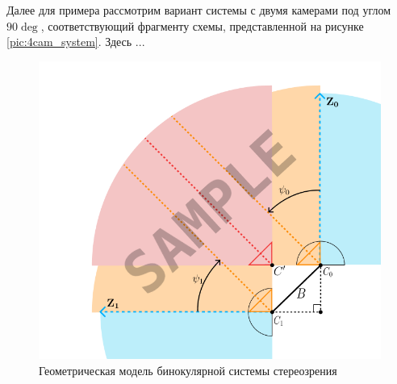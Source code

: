  Далее для примера рассмотрим вариант системы с двумя камерами под углом $90\deg$, соответствующий фрагменту схемы,     %
  представленной на рисунке \ref{pic:4cam_system}. Здесь ... %
\begin{figure}[H]
    \begin{center}
        \includegraphics[scale=0.5]{pics/sample_simple2cam.png}                                                          %
        \caption{Геометрическая модель бинокулярной системы стереозрения}
        \label{pic:2cam_scheme}
    \end{center}
\end{figure}

